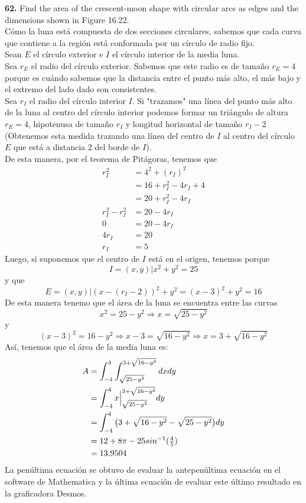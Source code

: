 \documentclass[11pt]{report}
\begin{document}
\textbf{62.} Find the area of the crescent-moon shape with circular arcs as edges
and the dimensions shown in Figure 16.22. \\

Cómo la luna está compuesta de dos secciones circulares, sabemos que cada curva que contiene
a la región está conformada por un círculo de radio fijo.\\
Sean $E$ el círculo exterior e $I$ el círculo interior de la media luna.\\
Sea $r_E$ el radio del círculo exterior. Sabemos que este radio es de tamaño $r_E=4$ porque es cuándo
sabemos que la distancia entre el punto más alto, el más bajo y el extremo del lado dado son
consistentes. \\
Sea $r_I$ el radio del círculo interior $I$. Si "trazamos" una línea del punto más alto de la luna
al centro del círculo interior podemos formar un triángulo de altura $r_E=4$, hipotenusa de
tamaño $r_I$ y longitud horizontal de tamaño $r_I-2$ (Obtenemos esta medida trazando una línea del
centro de $I$ al centro del círculo $E$ que está a distancia $2$ del borde de $I$).\\
De esta manera, por el teorema de Pitágoras, tenemos que
	\begin{align*}
		r_I^2	    &=4^2+(r_I)^2\\
			 	    &=16+r_I^2-4r_I+4\\
			 	    &=20+r_I^2-4r_I\\
		r_I^2-r_I^2 &=20-4r_I\\
		0 			&=20-4r_I\\
		4r_I		&=20\\
		r_I			&=5
	\end{align*}
Luego, si suponemos que el centro de $I$ está en el origen, tenemos porque
$$I={(x,y)|x^2+y^2=25}$$
y que
$$E={(x,y)|(x-(r_I-2))^2+ y^2=(x-3)^2+y^2=16}$$
De esta manera tenemo que el área de la luna se encuentra entre las curvas
$$x^2=25-y^2 \Rightarrow x=\sqrt{25-y^2}$$
y
$$(x-3)^2=16-y^2\Rightarrow x-3=\sqrt{16-y^2}\Rightarrow x=3+\sqrt{16-y^2}$$
Así, tenemos que el área de la media luna es:
	\begin{align*}
		A&=\int_{-4}^4\int_{\sqrt{25-y^2}}^{3+\sqrt{16-y^2}}dxdy\\
		 &=\int_{-4}^4x\Big|_{\sqrt{25-y^2}}^{3+\sqrt{16-y^2}}dy\\
		 &=\int_{-4}^4\big( 3+\sqrt{16-y^2}-\sqrt{25-y^2} \big)dy\\
		 &=12+8\pi-25sin^{-1}(\tfrac{4}{5})\\
		 &=13.9504 \\
	\end{align*}
La penúltima ecuación se obtuvo de evaluar la antepenúltima ecuación en el software
de Mathematica y la última ecuación de evaluar este último resultado en la graficadora Desmos.
\end{document}

